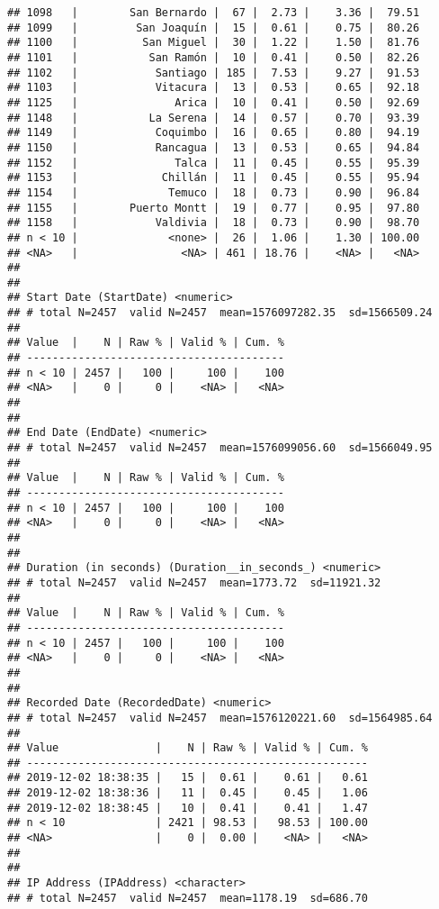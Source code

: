 \documentclass[
  10,
  landscape,
  legalpaper]{article}
\begin{document}
\begin{verbatim}
## 1098   |        San Bernardo |  67 |  2.73 |    3.36 |  79.51
## 1099   |         San Joaquín |  15 |  0.61 |    0.75 |  80.26
## 1100   |          San Miguel |  30 |  1.22 |    1.50 |  81.76
## 1101   |           San Ramón |  10 |  0.41 |    0.50 |  82.26
## 1102   |            Santiago | 185 |  7.53 |    9.27 |  91.53
## 1103   |            Vitacura |  13 |  0.53 |    0.65 |  92.18
## 1125   |               Arica |  10 |  0.41 |    0.50 |  92.69
## 1148   |           La Serena |  14 |  0.57 |    0.70 |  93.39
## 1149   |            Coquimbo |  16 |  0.65 |    0.80 |  94.19
## 1150   |            Rancagua |  13 |  0.53 |    0.65 |  94.84
## 1152   |               Talca |  11 |  0.45 |    0.55 |  95.39
## 1153   |             Chillán |  11 |  0.45 |    0.55 |  95.94
## 1154   |              Temuco |  18 |  0.73 |    0.90 |  96.84
## 1155   |        Puerto Montt |  19 |  0.77 |    0.95 |  97.80
## 1158   |            Valdivia |  18 |  0.73 |    0.90 |  98.70
## n < 10 |              <none> |  26 |  1.06 |    1.30 | 100.00
## <NA>   |                <NA> | 461 | 18.76 |    <NA> |   <NA>
## 
## 
## Start Date (StartDate) <numeric>
## # total N=2457  valid N=2457  mean=1576097282.35  sd=1566509.24
## 
## Value  |    N | Raw % | Valid % | Cum. %
## ----------------------------------------
## n < 10 | 2457 |   100 |     100 |    100
## <NA>   |    0 |     0 |    <NA> |   <NA>
## 
## 
## End Date (EndDate) <numeric>
## # total N=2457  valid N=2457  mean=1576099056.60  sd=1566049.95
## 
## Value  |    N | Raw % | Valid % | Cum. %
## ----------------------------------------
## n < 10 | 2457 |   100 |     100 |    100
## <NA>   |    0 |     0 |    <NA> |   <NA>
## 
## 
## Duration (in seconds) (Duration__in_seconds_) <numeric>
## # total N=2457  valid N=2457  mean=1773.72  sd=11921.32
## 
## Value  |    N | Raw % | Valid % | Cum. %
## ----------------------------------------
## n < 10 | 2457 |   100 |     100 |    100
## <NA>   |    0 |     0 |    <NA> |   <NA>
## 
## 
## Recorded Date (RecordedDate) <numeric>
## # total N=2457  valid N=2457  mean=1576120221.60  sd=1564985.64
## 
## Value               |    N | Raw % | Valid % | Cum. %
## -----------------------------------------------------
## 2019-12-02 18:38:35 |   15 |  0.61 |    0.61 |   0.61
## 2019-12-02 18:38:36 |   11 |  0.45 |    0.45 |   1.06
## 2019-12-02 18:38:45 |   10 |  0.41 |    0.41 |   1.47
## n < 10              | 2421 | 98.53 |   98.53 | 100.00
## <NA>                |    0 |  0.00 |    <NA> |   <NA>
## 
## 
## IP Address (IPAddress) <character>
## # total N=2457  valid N=2457  mean=1178.19  sd=686.70

\end{verbatim}
\end{document}
